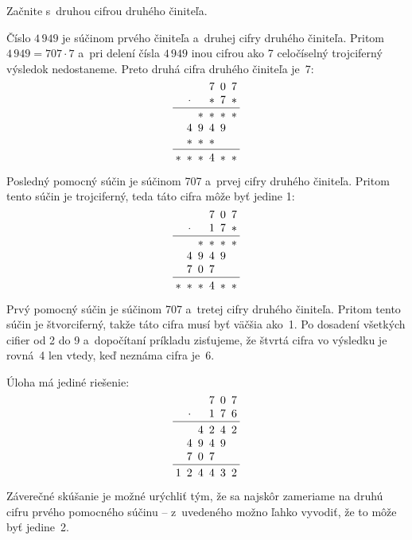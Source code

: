 {%
\napad
Začnite s~druhou cifrou druhého činiteľa.

\riesenie
Číslo $4\,949$ je súčinom prvého činiteľa a~druhej cifry druhého činiteľa.
Pritom $4\,949=707\cdot 7$ a~pri delení čísla $4\,949$ inou cifrou ako 7 celočíselný trojciferný výsledok nedostaneme. Preto druhá cifra druhého činiteľa je~7:
$$
\vbox{\let\\=\cr
\halign{&\hbox to1.0em{\hss$#$\hss}\cr
&&&7&0&7\\
&\times&&*&7&*\\
\noalign{\vskip4pt\hrule\vskip4pt}
&&*&*&*&*\\
&4&9&4&9&\\
&*&*&*&&\\
\noalign{\vskip4pt\hrule\vskip4pt}
*&*&*&4&*&*\\
}}
$$

Posledný pomocný súčin je súčinom 707 a~prvej cifry druhého činiteľa.
Pritom tento súčin je trojciferný, teda táto cifra môže byť jedine 1:
$$
\vbox{\let\\=\cr
\halign{&\hbox to1.0em{\hss$#$\hss}\cr
&&&7&0&7\\
&\times&&1&7&*\\
\noalign{\vskip4pt\hrule\vskip4pt}
&&*&*&*&*\\
&4&9&4&9&\\
&7&0&7&&\\
\noalign{\vskip4pt\hrule\vskip4pt}
*&*&*&4&*&*\\
}}
$$

Prvý pomocný súčin je súčinom 707 a~tretej cifry druhého činiteľa.
Pritom tento súčin je štvorciferný, takže táto cifra musí byť väčšia ako~1.
Po dosadení všetkých cifier od 2 do 9 a~dopočítaní príkladu zisťujeme, že štvrtá cifra vo výsledku je rovná~4 len vtedy, keď neznáma cifra je~6.

Úloha má jediné riešenie:
$$
\vbox{\let\\=\cr
\halign{&\hbox to1.0em{\hss$#$\hss}\cr
&&&7&0&7\\
&\times&&1&7&6\\
\noalign{\vskip4pt\hrule\vskip4pt}
&&4&2&4&2\\
&4&9&4&9&\\
&7&0&7&&\\
\noalign{\vskip4pt\hrule\vskip4pt}
1&2&4&4&3&2\\
}}
$$

\poznamka
Záverečné skúšanie je možné urýchliť tým, že sa najskôr zameriame na druhú cifru prvého pomocného súčinu -- z~uvedeného možno ľahko vyvodiť, že to môže byť jedine~2.
}

